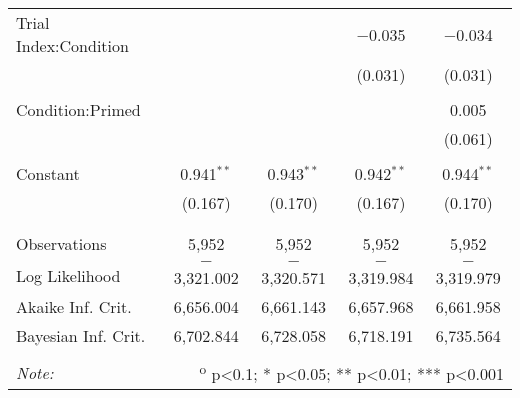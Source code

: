 \begin{table}[!htbp]
\begin{tabular}{@{\extracolsep{5pt}}lcccc}
 Trial Index:Condition &  &  & $-$0.035 & $-$0.034 \\
  &  &  & (0.031) & (0.031) \\
  & & & & \\
 Condition:Primed &  &  &  & 0.005 \\
  &  &  &  & (0.061) \\
  & & & & \\
 Constant & 0.941$^{**}$ & 0.943$^{**}$ & 0.942$^{**}$ & 0.944$^{**}$ \\
  & (0.167) & (0.170) & (0.167) & (0.170) \\
  & & & & \\
\hline \\[-1.8ex]
Observations & 5,952 & 5,952 & 5,952 & 5,952 \\
Log Likelihood & $-$3,321.002 & $-$3,320.571 & $-$3,319.984 & $-$3,319.979 \\
Akaike Inf. Crit. & 6,656.004 & 6,661.143 & 6,657.968 & 6,661.958 \\
Bayesian Inf. Crit. & 6,702.844 & 6,728.058 & 6,718.191 & 6,735.564 \\
\hline
\hline \\[-1.8ex]
\textit{Note:}  & \multicolumn{4}{r}{\textsuperscript{o} p<0.1; * p<0.05; ** p<0.01; *** p<0.001} \\
\end{tabular}
\end{table}
